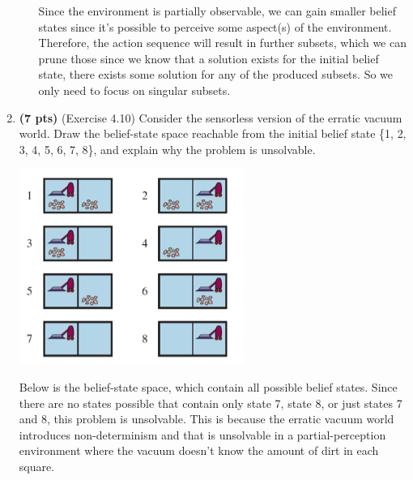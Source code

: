 \documentclass{article}
\begin{document}
\begin{enumerate}
\begin{enumerate}[label=($\alph*$)]
    \color{blue}
        Since the environment is partially observable, we can gain smaller belief states since it's possible to perceive some aspect(s) of the environment. Therefore, the action sequence will result in further subsets, which we can prune those since we know that a solution exists for the initial belief state, there exists some solution for any of the produced subsets. So we only need to focus on singular subsets.
    \color{black}


    \end{enumerate}



\item \textbf{(7 pts)} (Exercise 4.10) Consider the sensorless version of the erratic vacuum world. Draw the belief-state space reachable from the initial belief state \{1, 2, 3, 4, 5, 6, 7, 8\}, and explain why the problem is unsolvable.

\begin{center}
    \includegraphics[scale=0.75]{472-PS3-Q3.png}
\end{center}

\color{blue}
    Below is the belief-state space, which contain all possible belief states. Since there are no states possible that contain only state 7, state 8, or just states 7 and 8, this problem is unsolvable. This is because the erratic vacuum world introduces non-determinism and that is unsolvable in a partial-perception environment where the vacuum doesn't know the amount of dirt in each square.
\color{black}


\end{enumerate}
\end{document}
